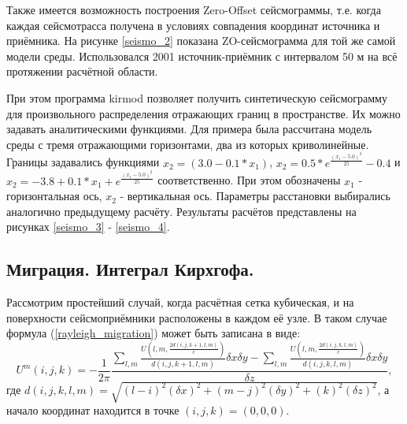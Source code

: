\documentclass{article}
\begin{document}
Также имеется возможность построения Zero-Offset сейсмограммы, т.е. когда каждая сейсмотрасса получена в условиях совпадения координат источника и приёмника.
На рисунке \ref{seismo_2} показана ZO-сейсмограмма для той же самой модели среды.
Использовался 2001 источник-приёмник с интервалом 50 м на всё протяжении расчётной области.

\noindent
\begin{minipage}{\linewidth}
\label{seismo_2}
\end{minipage}

При этом программа kirmod позволяет получить синтетическую сейсмограмму для произвольного распределения отражающих границ в пространстве.
Их можно задавать аналитическими функциями.
Для примера была рассчитана модель среды с тремя отражающими горизонтами, два из которых криволинейные.
Границы задавались функциями $x_2 = (3.0 - 0.1 * x_1)$, $x_2 = 0.5 * e^{\frac{(x_1 - 5.0)^2}{25}} - 0.4$ и $x_2 = -3.8 + 0.1 * x_1 + e^{\frac{(x_1 - 5.0)^2}{25}}$ соответственно.
При этом обозначены $x_1$ - горизонтальная ось, $x_2$ - вертикальная ось.
Параметры расстановки выбирались аналогично предыдущему расчёту.
Результаты расчётов представлены на рисунках \ref{seismo_3} - \ref{seismo_4}.

\noindent
\begin{minipage}{\linewidth}
\label{seismo_3}
\end{minipage}

\noindent
\begin{minipage}{\linewidth}
\label{seismo_4}
\end{minipage}

\subsection{Миграция. Интеграл Кирхгофа.}

Рассмотрим простейший случай, когда расчётная сетка кубическая, и на поверхности сейсмоприёмники расположены в каждом её узле.
В таком случае формула (\ref{rayleigh_migration}) может быть записана в виде:
\begin{equation}
\label{rayleigh_migration_discrete}
U^m(i,j,k) = -\frac{1}{2\pi}\frac{\sum\limits_{l,m} \frac{U(l,m,\frac{2d(i,j,k+1,l,m)}{c})}{d(i,j,k+1,l,m)}\delta x \delta y - \sum\limits_{l,m} \frac{U(l,m,\frac{2d(i,j,k,l,m)}{c})}{d(i,j,k,l,m)}\delta x \delta y}{\delta z},
\end{equation}
где $d(i,j,k,l,m)=\sqrt{(l-i)^2(\delta x)^2 + (m-j)^2(\delta y)^2  + (k)^2(\delta z)^2}$, а начало координат находится в точке $(i,j,k)=(0,0,0)$.
\end{document}
